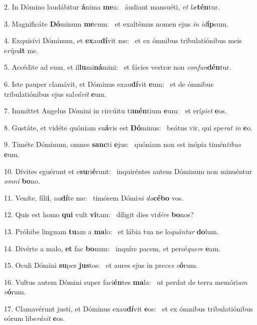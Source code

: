 2. In Dómino laudábitur \textbf{á}nima \textbf{me}a: \ast\  áudiant mansuéti, \textit{et} \textit{læ}\textbf{tén}tur.\

3. Magnificáte \textbf{Dó}minum \textbf{me}cum: \ast\  et exaltémus nomen ejus \textit{in} \textit{id}\textbf{íp}sum.\

4. Exquisívi Dóminum, et \textbf{ex}au\textbf{dí}vit me: \ast\  et ex ómnibus tribulatiónibus meis e\textit{rí}\textit{pu}\textbf{it} me.\

5. Accédite ad eum, et il\textbf{lu}mi\textbf{ná}mini: \ast\  et fácies vestræ non \textit{con}\textit{fun}\textbf{dén}tur.\

6. Iste pauper clamávit, et Dóminus exau\textbf{dí}vit \textbf{e}um: \ast\  et de ómnibus tribulatiónibus ejus sal\textit{vá}\textit{vit} \textbf{e}um.\

7. Immíttet Angelus Dómini in circúitu ti\textbf{mén}tium \textbf{e}um: \ast\  et erí\textit{pi}\textit{et} \textbf{e}os.\

8. Gustáte, et vidéte quóniam su\textbf{á}vis est \textbf{Dó}minus: \ast\  beátus vir, qui spe\textit{rat} \textit{in} \textbf{e}o.\

9. Timéte Dóminum, omnes \textbf{sanc}ti \textbf{e}jus: \ast\  quóniam non est inópia timén\textit{ti}\textit{bus} \textbf{e}um.\

10. Dívites eguérunt et e\textbf{su}ri\textbf{é}runt: \ast\  inquiréntes autem Dóminum non minuéntur \textit{om}\textit{ni} \textbf{bo}no.\

11. Veníte, fíli\textbf{i}, au\textbf{dí}te me: \ast\  timórem Dómi\textit{ni} \textit{do}\textbf{cé}\textbf{bo} vos.\

12. Quis est homo \textbf{qui} vult \textbf{vi}tam: \ast\  díligit dies vi\textit{dé}\textit{re} \textbf{bo}nos?\

13. Próhibe linguam \textbf{tu}am a \textbf{ma}lo: \ast\  et lábia tua ne lo\textit{quán}\textit{tur} \textbf{do}lum.\

14. Divérte a malo, \textbf{et} fac \textbf{bo}num: \ast\  inquíre pacem, et persé\textit{que}\textit{re} \textbf{e}am.\

15. Oculi Dómini \textbf{su}per \textbf{jus}tos: \ast\  et aures ejus in pre\textit{ces} \textit{e}\textbf{ó}rum.\

16. Vultus autem Dómini super faci\textbf{én}tes \textbf{ma}la: \ast\  ut perdat de terra memóri\textit{am} \textit{e}\textbf{ó}rum.\

17. Clamavérunt justi, et Dóminus exau\textbf{dí}vit \textbf{e}os: \ast\  et ex ómnibus tribulatiónibus eórum libe\textit{rá}\textit{vit} \textbf{e}os.\

